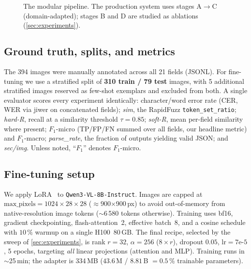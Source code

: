 \begin{figure}[t]
\centering
\footnotesize
\setlength{\fboxsep}{4pt}
\caption{The modular pipeline. The production system uses stages A$\rightarrow$C
(domain-adapted); stages B and D are studied as ablations
(\cref{sec:experiments}).}
\label{fig:pipeline}
\end{figure}

\subsection{Ground truth, splits, and metrics}
The 394 images were manually annotated across all 21 fields (JSONL). For
fine-tuning we use a stratified split of \textbf{310 train / 79 test} images,
with 5 additional stratified images reserved as few-shot exemplars and excluded
from both. A single evaluator scores every experiment identically:
character/word error rate (CER, WER via jiwer on concatenated fields);
\emph{sim}, the RapidFuzz \texttt{token\_set\_ratio}; \emph{hard-R}, recall at a
similarity threshold $\tau=0.85$; \emph{soft-R}, mean per-field similarity where
present; $F_1$-micro (TP/FP/FN summed over all fields, our headline metric) and
$F_1$-macro; \emph{parse\_rate}, the fraction of outputs yielding valid JSON;
and \emph{sec/img}. Unless noted, ``$F_1$'' denotes $F_1$-micro.

\subsection{Fine-tuning setup}
We apply LoRA~\cite{hu2022lora} to \texttt{Qwen3-VL-8B-Instruct}. Images are
capped at $\text{max\_pixels}=1024{\times}28{\times}28$
($\approx$900$\times$900\,px) to avoid out-of-memory from native-resolution
image tokens ($\sim$6\,580 tokens otherwise). Training uses bf16, gradient
checkpointing, flash-attention~2, effective batch~8, and a cosine schedule with
$10\,\%$ warmup on a single H100~80\,GB. The final recipe, selected by the
sweep of \cref{sec:experiments}, is rank $r=32$, $\alpha=256$ ($8{\times}r$),
dropout $0.05$, $\text{lr}=7\text{e-}5$, 5 epochs, targeting \emph{all} linear
projections (attention and MLP). Training runs in $\sim$25\,min; the adapter is
334\,MB ($43.6$\,M / $8.81$\,B $=0.5\,\%$ trainable parameters).
